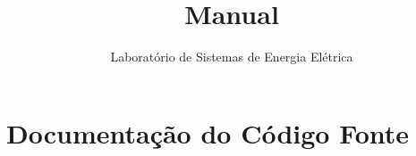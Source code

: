 \documentclass[12pt,a4paper]{book}
\title{Manual}
\author{Laboratório de Sistemas de Energia Elétrica}
\begin{document}
\maketitle
\newpage
{}
\tableofcontents   %
\newpage
\listoffigures
\newpage
\listoftables  %
\newpage
\lstlistoflistings
\newpage
\doublespacing %
\newpage













\chapter{Documentação do Código Fonte}\label{ch:documentacao}
\end{document}
